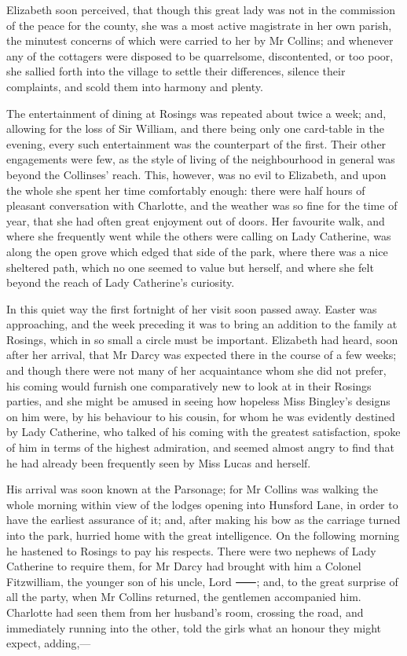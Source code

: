 Elizabeth soon perceived, that though this great lady was not in the commission of the peace for the county, she was a most active magistrate in her own parish, the minutest concerns of which were carried to her by Mr Collins; and whenever any of the cottagers were disposed to be quarrelsome, discontented, or too poor, she sallied forth into the village to settle their differences, silence their complaints, and scold them into harmony and plenty.

The entertainment of dining at Rosings was repeated about twice a week; and, allowing for the loss of Sir William, and there being only one card-table in the evening, every such entertainment was the counterpart of the first. Their other engagements were few, as the style of living of the neighbourhood in general was beyond the Collinses' reach. This, however, was no evil to Elizabeth, and upon the whole she spent her time comfortably enough: there were half hours of pleasant conversation with Charlotte, and the weather was so fine for the time of year, that she had often great enjoyment out of doors. Her favourite walk, and where she frequently went while the others were calling on Lady Catherine, was along the open grove which edged that side of the park, where there was a nice sheltered path, which no one seemed to value but herself, and where she felt beyond the reach of Lady Catherine's curiosity.

In this quiet way the first fortnight of her visit soon passed away. Easter was approaching, and the week preceding it was to bring an addition to the family at Rosings, which in so small a circle must be important. Elizabeth had heard, soon after her arrival, that Mr Darcy was expected there in the course of a few weeks; and though there were not many of her acquaintance whom she did not prefer, his coming would furnish one comparatively new to look at in their Rosings parties, and she might be amused in seeing how hopeless Miss Bingley's designs on him were, by his behaviour to his cousin, for whom he was evidently destined by Lady Catherine, who talked of his coming with the greatest satisfaction, spoke of him in terms of the highest admiration, and seemed almost angry to find that he had already been frequently seen by Miss Lucas and herself.

His arrival was soon known at the Parsonage; for Mr Collins was walking the whole morning within view of the lodges opening into Hunsford Lane, in order to have the earliest assurance of it; and, after making his bow as the carriage turned into the park, hurried home with the great intelligence. On the following morning he hastened to Rosings to pay his respects. There were two nephews of Lady Catherine to require them, for Mr Darcy had brought with him a Colonel Fitzwilliam, the younger son of his uncle, Lord ⸺; and, to the great surprise of all the party, when Mr Collins returned, the gentlemen accompanied him. Charlotte had seen them from her husband's room, crossing the road, and immediately running into the other, told the girls what an honour they might expect, adding,—

